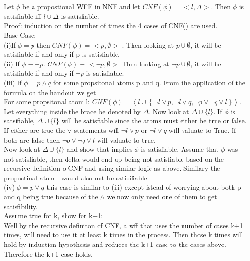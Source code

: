 \documentclass[11pt,leqno,fleqn]{article}
\begin{document}
\section{}
Let $\phi$ be a propostional WFF in NNF and let $CNF(\phi) = <l, \Delta>$. Then $\phi$ is satisfiable iff ${l} \cup \Delta$  is satisfiable.\\
Proof: induction on the number of times the 4 cases of CNF() are used. \\
Base Case: \\
(i)If $\phi = p$ then $CNF(\phi) = <p, \emptyset>$ . Then looking at $p \cup \emptyset$, it will be satisfiable if and only if p is satisfiable.\\
(ii) If $\phi = \neg{p}$.  $CNF(\phi) = <\neg{p} , \emptyset>$ Then looking at $\neg{p} \cup \emptyset$, it will be satisfiable if and only if $\neg{p}$ is satisfiable.\\
(iii) If $\phi = p \land q$ for some propsitonal atoms p and q. From the application of the formula on the handout we get\\
For some propsitonal atom l:
$CNF(\phi) = \left\langle l \cup \left\lbrace \neg l \vee p, \neg l \vee q, \neg p \vee \neg q \vee l \right\rbrace \right\rangle$. \\
Let everything inside the brace be denoted by $\Delta$. Now look at $\Delta \cup \{l\}$. If $\phi$ is satsifiable,  $\Delta \cup \{l\}$ will be satisfiable since the atoms must either be true or false. If either are  true the  $\lor$ statements will $\neg l \vee p$ or  $\neg l \vee q$ will valuate to True. If both are false then  $\neg p \vee \neg q \vee l $ will valuate to true. \\
Now look at $\Delta \cup \{l\}$ and show that implies $\phi$ is satisfiable. Assume that $\phi$ was not satisfiable, then delta would end up being not satisfiable based on the recursive definition o CNF and using similar logic as above. Similary the propostinal atom l would also not be satisifiable\\
(iv) $\phi = p \lor q$ this case is similar to (iii) except istead of worrying about both p and q being true because of the $\land$ we now only need one of them to get satisfibility. \\
Assume true for k, show for k+1:\\
Well by the recursive definiton of CNF, a wff that uses the number of cases k+1 times, will need to use it at least k times in the process. Then those k times will hold by induction hypothesis and reduces the k+1 case to the cases above. Therefore the k+1 case holds.
\end{document}
